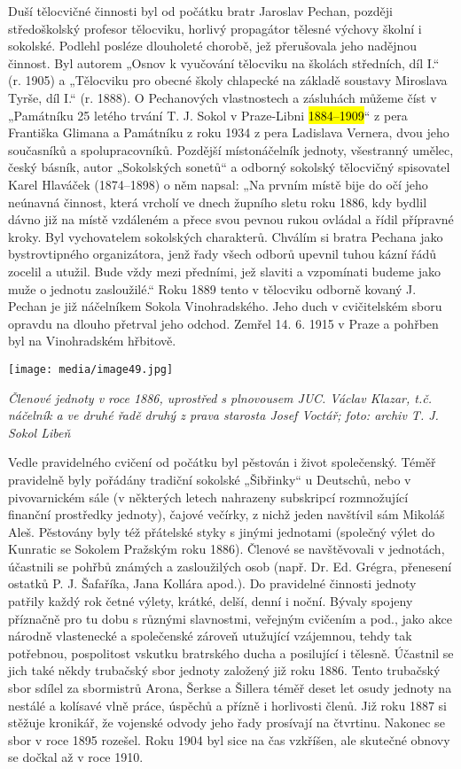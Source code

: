 Duší tělocvičné činnosti byl od počátku bratr Jaroslav Pechan, později
středoškolský profesor tělocviku, horlivý propagátor tělesné výchovy
školní i sokolské. Podlehl posléze dlouholeté chorobě, jež přerušovala
jeho nadějnou činnost. Byl autorem „Osnov k vyučování tělocviku na
školách středních, díl I.`` (r. 1905) a „Tělocviku pro obecné školy
chlapecké na základě soustavy Miroslava Tyrše, díl I.`` (r. 1888). O
Pechanových vlastnostech a zásluhách můžeme číst v „Památníku 25 letého
trvání T. J. Sokol v Praze-Libni \hl{1884--⁠⁠⁠⁠⁠⁠1909}`` z pera Františka
Glimana a Památníku z roku 1934 z pera Ladislava Vernera, dvou jeho
současníků a spolupracovníků. Pozdější místonáčelník jednoty, všestranný
umělec, český básník, autor „Sokolských sonetů`` a odborný sokolský
tělocvičný spisovatel Karel Hlaváček (1874--1898) o něm napsal: „Na
prvním místě bije do očí jeho neúnavná činnost, která vrcholí ve dnech
župního sletu roku 1886, kdy bydlil dávno již na místě vzdáleném a přece
svou pevnou rukou ovládal a řídil přípravné kroky. Byl vychovatelem
sokolských charakterů. Chválím si bratra Pechana jako bystrovtipného
organizátora, jenž řady všech odborů upevnil tuhou kázní řádů zocelil a
utužil. Bude vždy mezi předními, jež slaviti a vzpomínati budeme jako
muže o jednotu zasloužilé.`` Roku 1889 tento v tělocviku odborně kovaný
J. Pechan je již náčelníkem Sokola Vinohradského. Jeho duch v
cvičitelském sboru opravdu na dlouho přetrval jeho odchod. Zemřel 14. 6.
1915 v Praze a pohřben byl na Vinohradském hřbitově.

\texttt{[image: media/image49.jpg]}

\emph{Členové jednoty v roce 1886, uprostřed s plnovousem JUC. Václav
Klazar, t.č. náčelník a ve druhé řadě druhý z prava starosta Josef
Voctář; foto: archiv T. J. Sokol Libeň}

Vedle pravidelného cvičení od počátku byl pěstován i život společenský.
Téměř pravidelně byly pořádány tradiční sokolské „Šibřinky`` u Deutschů,
nebo v pivovarnickém sále (v některých letech nahrazeny subskripcí
rozmnožující finanční prostředky jednoty), čajové večírky, z nichž jeden
navštívil sám Mikoláš Aleš. Pěstovány byly též přátelské styky s jinými
jednotami (společný výlet do Kunratic se Sokolem Pražským roku 1886).
Členové se navštěvovali v jednotách, účastnili se pohřbů známých a
zasloužilých osob (např. Dr. Ed. Grégra, přenesení ostatků P. J.
Šafaříka, Jana Kollára apod.). Do pravidelné činnosti jednoty patřily
každý rok četné výlety, krátké, delší, denní i noční. Bývaly spojeny
příznačně pro tu dobu s různými slavnostmi, veřejným cvičením a pod.,
jako akce národně vlastenecké a společenské zároveň utužující vzájemnou,
tehdy tak potřebnou, pospolitost vskutku bratrského ducha a posilující i
tělesně. Účastnil se jich také někdy trubačský sbor jednoty založený již
roku 1886. Tento trubačský sbor sdílel za sbormistrů Arona, Šerkse a
Šillera téměř deset let osudy jednoty na nestálé a kolísavé vlně práce,
úspěchů a přízně i horlivosti členů. Již roku 1887 si stěžuje kronikář,
že vojenské odvody jeho řady prosívají na čtvrtinu. Nakonec se sbor v
roce 1895 rozešel. Roku 1904 byl sice na čas vzkříšen, ale skutečné
obnovy se dočkal až v roce 1910.

